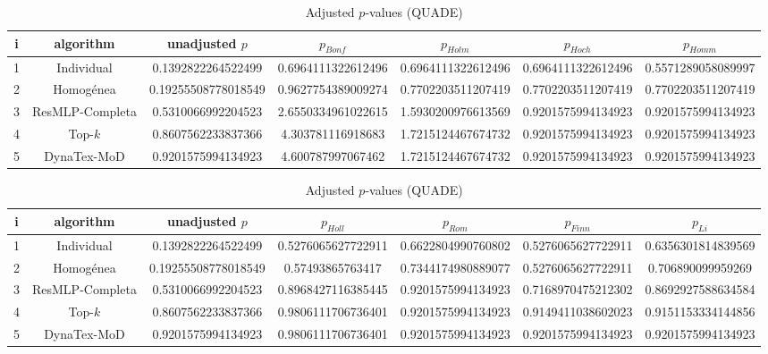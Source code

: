 \documentclass[a4paper,10pt]{article}
\begin{document}
\begin{landscape}
\begin{table}[!htp]
\centering\scriptsize
\caption{Adjusted $p$-values (QUADE)}
\begin{tabular}{ccccccc}
i&algorithm&unadjusted $p$&$p_{Bonf}$&$p_{Holm}$&$p_{Hoch}$&$p_{Homm}$\\
\hline
1&Individual&0.1392822264522499&0.6964111322612496&0.6964111322612496&0.6964111322612496&0.5571289058089997\\
2&Homogénea&0.19255508778018549&0.9627754389009274&0.7702203511207419&0.7702203511207419&0.7702203511207419\\
3&ResMLP-Completa&0.5310066992204523&2.6550334961022615&1.5930200976613569&0.9201575994134923&0.9201575994134923\\
4&Top-$k$&0.8607562233837366&4.303781116918683&1.7215124467674732&0.9201575994134923&0.9201575994134923\\
5&DynaTex-MoD&0.9201575994134923&4.600787997067462&1.7215124467674732&0.9201575994134923&0.9201575994134923\\
\hline
\end{tabular}
\end{table}

\begin{table}[!htp]
\centering\scriptsize
\caption{Adjusted $p$-values (QUADE)}
\begin{tabular}{ccccccc}
i&algorithm&unadjusted $p$&$p_{Holl}$&$p_{Rom}$&$p_{Finn}$&$p_{Li}$\\
\hline
1&Individual&0.1392822264522499&0.5276065627722911&0.6622804990760802&0.5276065627722911&0.6356301814839569\\
2&Homogénea&0.19255508778018549&0.57493865763417&0.7344174980889077&0.5276065627722911&0.706890099959269\\
3&ResMLP-Completa&0.5310066992204523&0.8968427116385445&0.9201575994134923&0.7168970475212302&0.8692927588634584\\
4&Top-$k$&0.8607562233837366&0.9806111706736401&0.9201575994134923&0.9149411038602023&0.9151153334144856\\
5&DynaTex-MoD&0.9201575994134923&0.9806111706736401&0.9201575994134923&0.9201575994134923&0.9201575994134923\\
\hline
\end{tabular}
\end{table}

\end{landscape}
\end{document}
